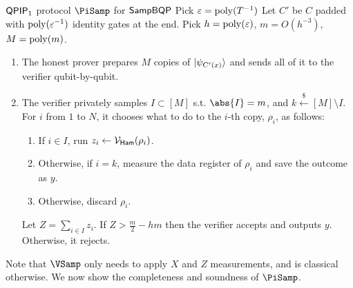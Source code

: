 \begin{protocol}{$\operatorname{\mathsf{QPIP}}_1$ protocol $\PiSamp$ for $\operatorname{\mathsf{SampBQP}}$}\label{ProtoQPIP1}
	Pick $\varepsilon=\operatorname*{\operatorname{poly}}(T^{-1})$
	Let $C'$ be $C$ padded with $\operatorname*{\operatorname{poly}}(\varepsilon^{-1})$ identity gates at the end.
	Pick $h=\operatorname*{\operatorname{poly}}(\varepsilon)$, $m=O(h^{-3})$, $M=\operatorname*{\operatorname{poly}}(m)$.

	\begin{enumerate}
		\item The honest prover prepares $M$ copies of $\ket{\psi_{C'(x)}}$ and sends all of it to the verifier qubit-by-qubit.
		\item The verifier privately samples $I\subset[M]$ s.t. $\abs{I}=m$, and $k\xleftarrow{\$}[M]\setminus I$.
			For $i$ from $1$ to $N$, it chooses what to do to the $i$-th copy, $\rho_i$, as follows:
		\begin{enumerate}
			\item If $i\in I$, run $z_i\leftarrow\mathcal{V}_{\mathsf{Ham}}(\rho_i)$.
			\item Otherwise, if $i=k$, measure the data register of $\rho_i$ and save the outcome as $y$.
			\item Otherwise, discard $\rho_i$.
		\end{enumerate}
			Let $Z=\sum_{i\in I} z_i$. If $Z>\frac{m}{2}-hm$ then the verifier accepts and outputs $y$. Otherwise, it rejects.
	\end{enumerate}
\end{protocol}

Note that $\VSamp$ only needs to apply $X$ and $Z$ measurements, and is classical otherwise. We now show the completeness and soundness of $\PiSamp$.

